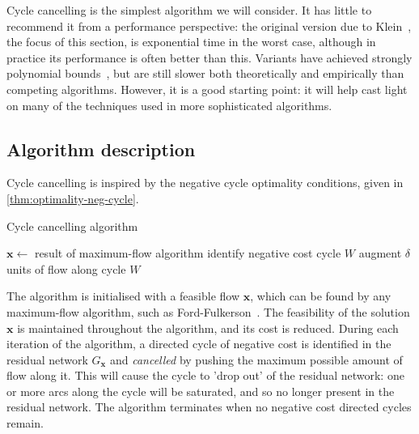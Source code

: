 
Cycle cancelling is the simplest algorithm we will consider. It has little to recommend it from a performance perspective: the original version due to Klein~\cite{Klein:1967}, the focus of this section, is exponential time in the worst case, although in practice its performance is often better than this. Variants have achieved strongly polynomial bounds~\cite{Goldberg:1989,Sokkalingam:2000}, but are still slower both theoretically and empirically than competing algorithms. However, it is a good starting point: it will help cast light on many of the techniques used in more sophisticated algorithms.

\subsection{Algorithm description}

Cycle cancelling is inspired by the negative cycle optimality conditions, given in \cref{thm:optimality-neg-cycle}.

\begin{algorithm}
    \caption{Cycle cancelling algorithm}
    \label{algo:cycle-cancelling}
    \begin{algorithmic}[1]
        \State $\mathbf{x}\gets $ result of maximum-flow algorithm 
        \State identify negative cost cycle $W$ 
        \State augment $\delta$ units of flow along cycle $W$
        \EndWhile{}
    \end{algorithmic}
\end{algorithm}

The algorithm is initialised with a feasible flow $\mathbf{x}$, which can be found by any maximum-flow algorithm, such as Ford-Fulkerson~\cite{FordFulkerson:1956}. The feasibility of the solution $\mathbf{x}$ is maintained throughout the algorithm, and its cost is reduced. During each iteration of the algorithm, a directed cycle of negative cost is identified in the residual network $G_\mathbf{x}$ and \emph{cancelled} by pushing the maximum possible amount of flow along it. This will cause the cycle to 'drop out' of the residual network: one or more arcs along the cycle will be saturated, and so no longer present in the residual network. The algorithm terminates when no negative cost directed cycles remain.


